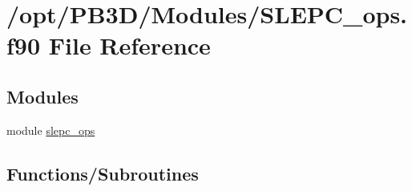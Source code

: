 \hypertarget{SLEPC__ops_8f90}{}\section{/opt/\+P\+B3\+D/\+Modules/\+S\+L\+E\+P\+C\+\_\+ops.f90 File Reference}
\label{SLEPC__ops_8f90}
\subsection*{Modules}
\begin{DoxyCompactItemize}
\item 
module \hyperlink{namespaceslepc__ops}{slepc\+\_\+ops}
\end{DoxyCompactItemize}
\subsection*{Functions/\+Subroutines}
